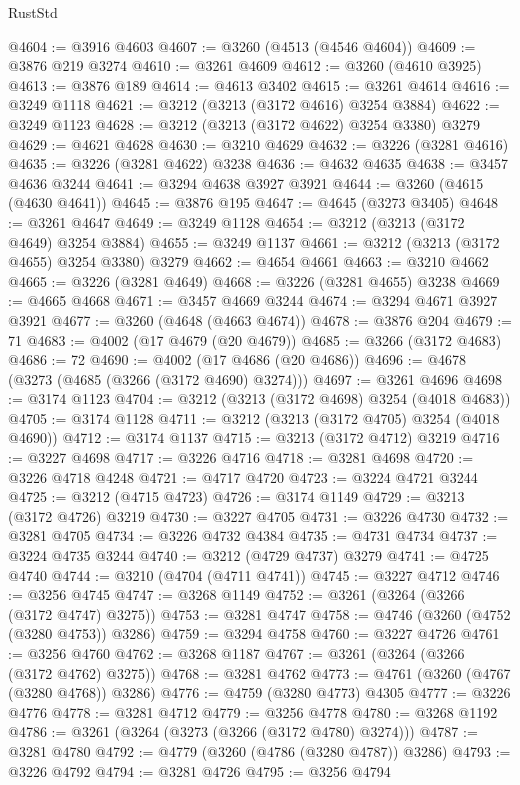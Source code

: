 \begin{lexlean}{RustStd}
\begin{coremodule}
@4604 := @3916 @4603
@4607 := @3260 (@4513 (@4546 @4604))
@4609 := @3876 @219 @3274
@4610 := @3261 @4609
@4612 := @3260 (@4610 @3925)
@4613 := @3876 @189
@4614 := @4613 @3402
@4615 := @3261 @4614
@4616 := @3249 @1118
@4621 := @3212 (@3213 (@3172 @4616) @3254 @3884)
@4622 := @3249 @1123
@4628 := @3212 (@3213 (@3172 @4622) @3254 @3380) @3279
@4629 := @4621 @4628
@4630 := @3210 @4629
@4632 := @3226 (@3281 @4616)
@4635 := @3226 (@3281 @4622) @3238
@4636 := @4632 @4635
@4638 := @3457 @4636 @3244
@4641 := @3294 @4638 @3927 @3921
@4644 := @3260 (@4615 (@4630 @4641))
@4645 := @3876 @195
@4647 := @4645 (@3273 @3405)
@4648 := @3261 @4647
@4649 := @3249 @1128
@4654 := @3212 (@3213 (@3172 @4649) @3254 @3884)
@4655 := @3249 @1137
@4661 := @3212 (@3213 (@3172 @4655) @3254 @3380) @3279
@4662 := @4654 @4661
@4663 := @3210 @4662
@4665 := @3226 (@3281 @4649)
@4668 := @3226 (@3281 @4655) @3238
@4669 := @4665 @4668
@4671 := @3457 @4669 @3244
@4674 := @3294 @4671 @3927 @3921
@4677 := @3260 (@4648 (@4663 @4674))
@4678 := @3876 @204
@4679 := 71
@4683 := @4002 (@17 @4679 (@20 @4679))
@4685 := @3266 (@3172 @4683)
@4686 := 72
@4690 := @4002 (@17 @4686 (@20 @4686))
@4696 := @4678 (@3273 (@4685 (@3266 (@3172 @4690) @3274)))
@4697 := @3261 @4696
@4698 := @3174 @1123
@4704 := @3212 (@3213 (@3172 @4698) @3254 (@4018 @4683))
@4705 := @3174 @1128
@4711 := @3212 (@3213 (@3172 @4705) @3254 (@4018 @4690))
@4712 := @3174 @1137
@4715 := @3213 (@3172 @4712) @3219
@4716 := @3227 @4698
@4717 := @3226 @4716
@4718 := @3281 @4698
@4720 := @3226 @4718 @4248
@4721 := @4717 @4720
@4723 := @3224 @4721 @3244
@4725 := @3212 (@4715 @4723)
@4726 := @3174 @1149
@4729 := @3213 (@3172 @4726) @3219
@4730 := @3227 @4705
@4731 := @3226 @4730
@4732 := @3281 @4705
@4734 := @3226 @4732 @4384
@4735 := @4731 @4734
@4737 := @3224 @4735 @3244
@4740 := @3212 (@4729 @4737) @3279
@4741 := @4725 @4740
@4744 := @3210 (@4704 (@4711 @4741))
@4745 := @3227 @4712
@4746 := @3256 @4745
@4747 := @3268 @1149
@4752 := @3261 (@3264 (@3266 (@3172 @4747) @3275))
@4753 := @3281 @4747
@4758 := @4746 (@3260 (@4752 (@3280 @4753)) @3286)
@4759 := @3294 @4758
@4760 := @3227 @4726
@4761 := @3256 @4760
@4762 := @3268 @1187
@4767 := @3261 (@3264 (@3266 (@3172 @4762) @3275))
@4768 := @3281 @4762
@4773 := @4761 (@3260 (@4767 (@3280 @4768)) @3286)
@4776 := @4759 (@3280 @4773) @4305
@4777 := @3226 @4776
@4778 := @3281 @4712
@4779 := @3256 @4778
@4780 := @3268 @1192
@4786 := @3261 (@3264 (@3273 (@3266 (@3172 @4780) @3274)))
@4787 := @3281 @4780
@4792 := @4779 (@3260 (@4786 (@3280 @4787)) @3286)
@4793 := @3226 @4792
@4794 := @3281 @4726
@4795 := @3256 @4794

\end{coremodule}
\end{lexlean}
